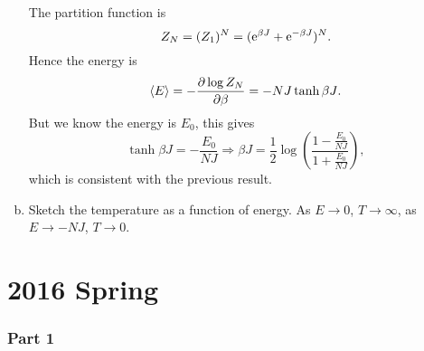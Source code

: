 \documentclass[10pt]{article}
\begin{document}
\begin{enumerate}[(a)]
		The partition function is 
		\begin{equation}
			Z_N = (Z_1)^N = ({\mathrm{e}}^{\beta J} + {\mathrm{e}}^{-\beta J})^N.
		\end{equation}
		Hence the energy is 
		\begin{equation}
			\ev{E} = - \pdv{\log{Z_N}}{\beta} = - NJ \tanh{\beta J}.
		\end{equation}
		But we know the energy is $E_0$, this gives 
		\begin{equation}
			\tanh{\beta J} = -\frac{E_0}{NJ} \Longrightarrow \beta J = \frac{1}{2} \log(\frac{1-\frac{E_0}{NJ}}{1+\frac{E_0}{NJ}}),
		\end{equation}
		which is consistent with the previous result.
	\item Sketch the temperature as a function of energy. 
		As $E \to 0$, $T \to \infty$, as $E \to -NJ$, $T \to 0$.
\end{enumerate}
\part{2016 Spring}
\section{Part 1}
\end{document}

